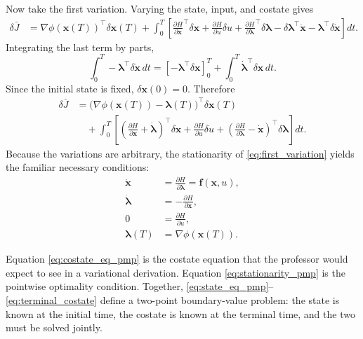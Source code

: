 \documentclass[conference]{IEEEtran}
\begin{document}
Now take the first variation. Varying the state, input, and costate gives
\begin{align}
\delta \bar{J}
&=
\nabla \phi(\bm{x}(T))^{\top}\delta \bm{x}(T)
+
\int_0^T
\left[
\frac{\partial H}{\partial \bm{x}}^{\top}\delta \bm{x}
+
\frac{\partial H}{\partial u}\delta u
+
\frac{\partial H}{\partial \bm{\lambda}}^{\top}\delta \bm{\lambda}
- \delta\bm{\lambda}^{\top}\dot{\bm{x}}
- \bm{\lambda}^{\top}\delta\dot{\bm{x}}
\right] dt.
\end{align}
Integrating the last term by parts,
\begin{equation}
\int_0^T -\bm{\lambda}^{\top}\delta \dot{\bm{x}}\,dt
=
\left[-\bm{\lambda}^{\top}\delta \bm{x}\right]_{0}^{T}
+
\int_0^T \dot{\bm{\lambda}}^{\top}\delta \bm{x}\,dt.
\end{equation}
Since the initial state is fixed, $\delta \bm{x}(0)=0$. Therefore
\begin{align}
\delta \bar{J}
&=
\big(\nabla \phi(\bm{x}(T))-\bm{\lambda}(T)\big)^{\top}\delta \bm{x}(T)
\nonumber\\
&\quad
+
\int_0^T
\left[
\left(\frac{\partial H}{\partial \bm{x}}+\dot{\bm{\lambda}}\right)^{\top}\delta \bm{x}
+
\frac{\partial H}{\partial u}\delta u
+
\left(\frac{\partial H}{\partial \bm{\lambda}}-\dot{\bm{x}}\right)^{\top}\delta \bm{\lambda}
\right] dt.
\label{eq:first_variation}
\end{align}
Because the variations are arbitrary, the stationarity of \eqref{eq:first_variation} yields the familiar necessary conditions:
\begin{align}
\dot{\bm{x}} &= \frac{\partial H}{\partial \bm{\lambda}} = \bm{f}(\bm{x},u),
\label{eq:state_eq_pmp}
\\
\dot{\bm{\lambda}} &= -\frac{\partial H}{\partial \bm{x}},
\label{eq:costate_eq_pmp}
\\
0 &= \frac{\partial H}{\partial u},
\label{eq:stationarity_pmp}
\\
\bm{\lambda}(T) &= \nabla \phi(\bm{x}(T)).
\label{eq:terminal_costate}
\end{align}

Equation \eqref{eq:costate_eq_pmp} is the costate equation that the professor would expect to see in a variational derivation. Equation \eqref{eq:stationarity_pmp} is the pointwise optimality condition. Together, \eqref{eq:state_eq_pmp}--\eqref{eq:terminal_costate} define a two-point boundary-value problem: the state is known at the initial time, the costate is known at the terminal time, and the two must be solved jointly.
\end{document}
